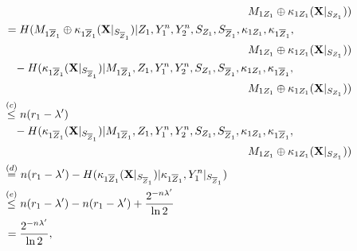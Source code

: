 \documentclass[runningheads]{llncs}
\begin{document}
\begin{itemize}
\begin{align}
        & \qquad \qquad \qquad \qquad \qquad \qquad \qquad \qquad \qquad \qquad \qquad M_{1Z_1}\oplus\kappa_{1Z_1} (\mathbf{X}|_{S_{Z_1}}))\notag\\
        &\, = H (  M_{1\overline{Z}_1}\oplus\kappa_{1\overline{Z}_1}(\mathbf{X}|_{S_{\overline{Z}_1}})|Z_1, Y_1^n, Y_2^n,  S_{Z_1},S_{\overline{Z}_1}, \kappa_{1Z_1}, \kappa_{1\overline{Z}_1},\notag\\
        & \qquad \qquad \qquad \qquad \qquad \qquad \qquad \qquad \qquad \qquad \qquad M_{1Z_1}\oplus\kappa_{1Z_1} (\mathbf{X}|_{S_{Z_1}}))\notag\\
        & \quad - H (\kappa_{1\overline{Z}_1}(\mathbf{X}|_{S_{\overline{Z}_1}})|M_{1\overline{Z}_1},Z_1, Y_1^n, Y_2^n,  S_{Z_1},S_{\overline{Z}_1}, \kappa_{1Z_1}, \kappa_{1\overline{Z}_1},\notag\\
        & \qquad \qquad \qquad \qquad \qquad \qquad \qquad \qquad \qquad \qquad \qquad M_{1Z_1}\oplus\kappa_{1Z_1} (\mathbf{X}|_{S_{Z_1}}))\notag\\
        & \overset{(c)}{\leq} n (r_1-\lambda')\notag\\
        & \quad -  H (\kappa_{1\overline{Z}_1}(\mathbf{X}|_{S_{\overline{Z}_1}})|M_{1\overline{Z}_1},Z_1, Y_1^n, Y_2^n,  S_{Z_1},S_{\overline{Z}_1}, \kappa_{1Z_1}, \kappa_{1\overline{Z}_1}, \notag\\
        & \qquad \qquad \qquad \qquad \qquad \qquad \qquad \qquad \qquad \qquad \qquad M_{1Z_1}\oplus\kappa_{1Z_1} (\mathbf{X}|_{S_{Z_1}}))\notag\\
        & \overset{(d)}{=} n (r_1-\lambda') -  H (\kappa_{1\overline{Z}_1}(\mathbf{X}|_{S_{\overline{Z}_1}})|\kappa_{1\overline{Z}_1}, Y_1^n|_{S_{\overline{Z}_1}})\notag\\
        & \overset{(e)}{\leq} n (r_1-\lambda') - n(r_1-\lambda') + \frac{2^{-n\lambda'}}{\ln 2}\notag\\
        & \, = \frac{2^{-n\lambda'}}{\ln 2},
    \end{align}
    

\end{itemize}
\end{document}
